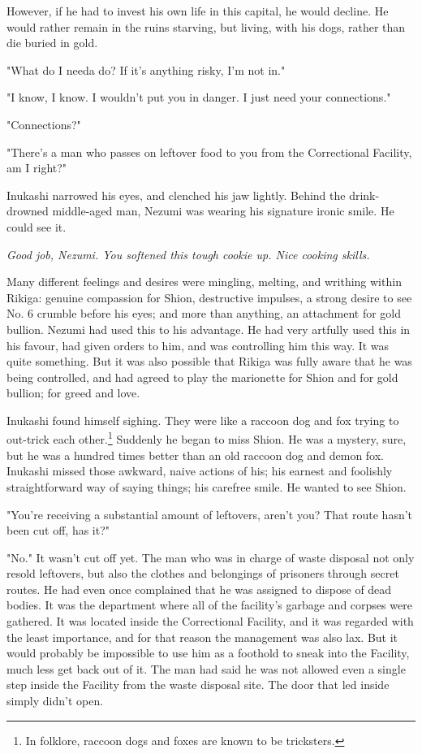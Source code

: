 However, if he had to invest his own life in this capital, he would
decline. He would rather remain in the ruins starving, but living, with
his dogs, rather than die buried in gold.

"What do I needa do? If it's anything risky, I'm not in."

"I know, I know. I wouldn't put you in danger. I just need your
connections."

"Connections?"

"There's a man who passes on leftover food to you from the Correctional
Facility, am I right?"

Inukashi narrowed his eyes, and clenched his jaw lightly. Behind the
drink-drowned middle-aged man, Nezumi was wearing his signature ironic
smile. He could see it.

\emph{Good job, Nezumi. You softened this tough cookie up. Nice cooking
skills.}

Many different feelings and desires were mingling, melting, and writhing
within Rikiga: genuine compassion for Shion, destructive impulses, a
strong desire to see No. 6 crumble before his eyes; and more than
anything, an attachment for gold bullion. Nezumi had used this to his
advantage. He had very artfully used this in his favour, had given
orders to him, and was controlling him this way. It was quite something.
But it was also possible that Rikiga was fully aware that he was being
controlled, and had agreed to play the marionette for Shion and for gold
bullion; for greed and love.

Inukashi found himself sighing. They were like a raccoon dog and
fox trying to out-trick each other.\footnote{In folklore, raccoon dogs and foxes are known to be tricksters.} Suddenly he began to miss
Shion. He was a mystery, sure, but he was a hundred times better than an
old raccoon dog and demon fox. Inukashi missed those awkward, naive
actions of his; his earnest and foolishly straightforward way of saying
things; his carefree smile. He wanted to see Shion.

"You're receiving a substantial amount of leftovers, aren't you? That
route hasn't been cut off, has it?"

"No." It wasn't cut off yet. The man who was in charge of waste disposal
not only resold leftovers, but also the clothes and belongings of
prisoners through secret routes. He had even once complained that he was
assigned to dispose of dead bodies. It was the department where all of
the facility's garbage and corpses were gathered. It was located inside
the Correctional Facility, and it was regarded with the least
importance, and for that reason the management was also lax. But it
would probably be impossible to use him as a foothold to sneak into the
Facility, much less get back out of it. The man had said he was not
allowed even a single step inside the Facility from the waste disposal
site. The door that led inside simply didn't open.

